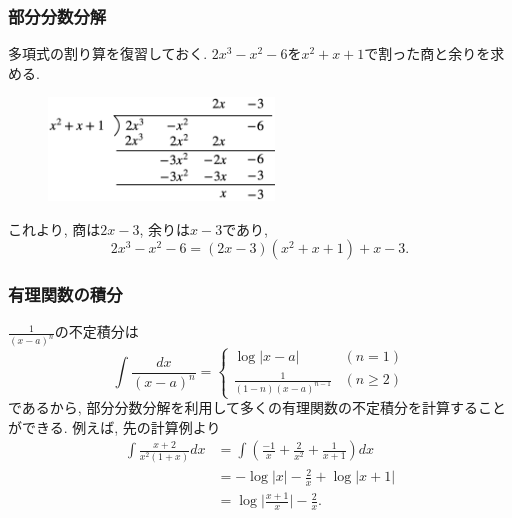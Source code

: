 \begin{frame}
\frametitle{部分分数分解}

多項式の割り算を復習しておく. 
$2x^3-x^2-6$を$x^2+x+1$で割った商と余りを求める. 

\vspace{-2mm}

 \begin{figure}[htbp]
 \begin{center} 
  \includegraphics[width=60mm]{calculus11/poly_quot.png}
 \end{center}
\end{figure}
これより, 商は$2x-3$, 余りは$x-3$であり, 
$$
2x^3-x^2-6 = (2x-3)(x^2+x+1)+x-3. 
$$

\end{frame}






\begin{frame}
\frametitle{有理関数の積分}

$\frac{1}{(x-a)^n}$の不定積分は
$$
\int \frac{dx}{(x-a)^n}=
\begin{cases}
\log|x-a| & (n=1)\\
\frac{1}{(1-n)(x-a)^{n-1}} & (n \ge 2)
\end{cases}
$$
であるから, 部分分数分解を利用して多くの有理関数の不定積分を計算することができる. 
例えば, 先の計算例より
\begin{align*}
\int \frac{x+2}{x^2(1+x)} dx
& =  \int (\frac{-1}{x}+  \frac{2}{x^2}+ \frac{1}{x+1})dx \\
& =  -\log |x| -\frac{2}{x} + \log |x+1| \\
& = \log \Big| \frac{x+1}{x}\Big| -\frac{2}{x}. 
\end{align*}


\end{frame}





